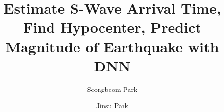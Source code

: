 \documentclass[sigconf]{acmart}
\renewcommand\_{\textunderscore\allowbreak}
\newcommand*{\TitleFont}{%
      \usefont{\encodingdefault}{\rmdefault}{b}{n}%
      \fontsize{20}{20}%
      \selectfont}
\begin{document}
\title{Estimate S-Wave Arrival Time, Find Hypocenter, Predict Magnitude of Earthquake with DNN}

\author{Seongbeom Park}

\author{Jinsu Park}

\maketitle







\end{document}
